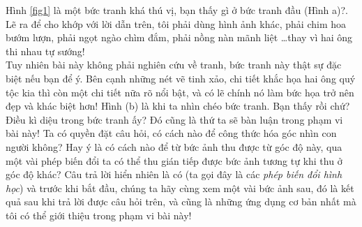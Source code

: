 \documentclass{article}
\begin{document}
Hình \ref{fig1} là một bức tranh khá thú vị, bạn thấy gì ở bức tranh đầu (Hình a)?. Lẽ ra để cho khớp với lời dẫn trên, tôi phải dùng hình ảnh khác, phải chim hoa bướm lượn, phải ngọt ngào chìm đắm, phải nồng nàn mãnh liệt \ldots thay vì hai ông thi nhau tự sướng!\\
Tuy nhiên bài này không phải nghiên cứu về tranh, bức tranh này thật sự đặc biệt nếu bạn để ý. Bên cạnh những nét vẽ tinh xảo, chi tiết khắc họa hai ông quý tộc kia thì còn một chi tiết nữa rõ nổi bật, và có lẽ chính nó làm bức họa trở nên đẹp và khác biệt hơn! Hình (b) là khi ta nhìn chéo bức tranh. Bạn thấy rồi chứ? Điều kì diệu trong bức tranh ấy? Đó cũng là thứ ta sẽ bàn luận trong phạm vi bài này! Ta có quyền đặt câu hỏi, có cách nào để công thức hóa góc nhìn con người không? Hay ý là có cách nào để từ bức ảnh thu được từ góc độ này, qua một vài phép biến đổi ta có thể thu gián tiếp được bức ảnh tương tự khi thu ở góc độ khác? Câu trả lời hiển nhiên là có (ta gọi đây là các \textit{phép biến đổi hình học}) và trước khi bắt đầu, chúng ta hãy cùng xem một vài bức ảnh sau, đó là kết quả sau khi trả lời được câu hỏi trên, và cũng là những ứng dụng cơ bản nhất mà tôi có thể giới thiệu trong phạm vi bài này!\\
\end{document}
